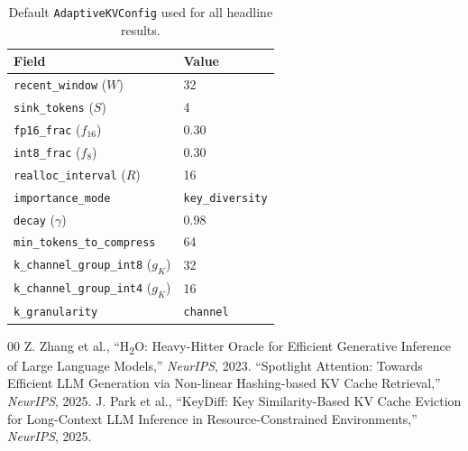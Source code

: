 \documentclass[conference]{IEEEtran}
\begin{document}
\begin{table}[h]
\centering
\caption{Default \texttt{AdaptiveKVConfig} used for all headline results.}
\label{tab:hyperparams}
\begin{tabular}{ll}
\toprule
Field & Value \\
\midrule
\texttt{recent\_window} ($W$) & 32 \\
\texttt{sink\_tokens} ($S$) & 4 \\
\texttt{fp16\_frac} ($f_{16}$) & 0.30 \\
\texttt{int8\_frac} ($f_8$) & 0.30 \\
\texttt{realloc\_interval} ($R$) & 16 \\
\texttt{importance\_mode} & \texttt{key\_diversity} \\
\texttt{decay} ($\gamma$) & 0.98 \\
\texttt{min\_tokens\_to\_compress} & 64 \\
\texttt{k\_channel\_group\_int8} ($g_K$) & 32 \\
\texttt{k\_channel\_group\_int4} ($g_K$) & 16 \\
\texttt{k\_granularity} & \texttt{channel} \\
\bottomrule
\end{tabular}
\end{table}

\begin{thebibliography}{00}
 Z. Zhang et al., ``H\textsubscript{2}O: Heavy-Hitter Oracle for Efficient
Generative Inference of Large Language Models,'' \textit{NeurIPS}, 2023.
 ``Spotlight Attention: Towards Efficient LLM Generation via
Non-linear Hashing-based KV Cache Retrieval,'' \textit{NeurIPS}, 2025.
 J. Park et al., ``KeyDiff: Key Similarity-Based KV Cache Eviction for
Long-Context LLM Inference in Resource-Constrained Environments,'' \textit{NeurIPS},
2025.
\end{thebibliography}
\end{document}
